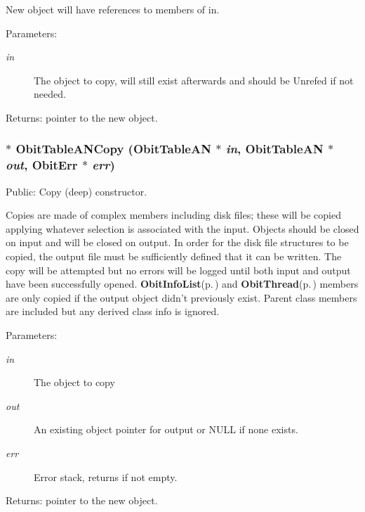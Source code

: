 New object will have references to members of in. \begin{Desc}
\item[Parameters:]
\begin{description}
\item[{\em in}]The object to copy, will still exist afterwards and should be Unrefed if not needed. \end{description}
\end{Desc}
\begin{Desc}
\item[Returns:]pointer to the new object. \end{Desc}
\subsubsection{$\ast$ Obit\-Table\-ANCopy ({\bf Obit\-Table\-AN} $\ast$ {\em in}, {\bf Obit\-Table\-AN} $\ast$ {\em out}, {\bf Obit\-Err} $\ast$ {\em err})}\label{ObitTableAN_8c_a20}


Public: Copy (deep) constructor. 

Copies are made of complex members including disk files; these will be copied applying whatever selection is associated with the input. Objects should be closed on input and will be closed on output. In order for the disk file structures to be copied, the output file must be sufficiently defined that it can be written. The copy will be attempted but no errors will be logged until both input and output have been successfully opened. {\bf Obit\-Info\-List}{\rm (p.\,\pageref{structObitInfoList})} and {\bf Obit\-Thread}{\rm (p.\,\pageref{structObitThread})} members are only copied if the output object didn't previously exist. Parent class members are included but any derived class info is ignored. \begin{Desc}
\item[Parameters:]
\begin{description}
\item[{\em in}]The object to copy \item[{\em out}]An existing object pointer for output or NULL if none exists. \item[{\em err}]Error stack, returns if not empty. \end{description}
\end{Desc}
\begin{Desc}
\item[Returns:]pointer to the new object. \end{Desc}
